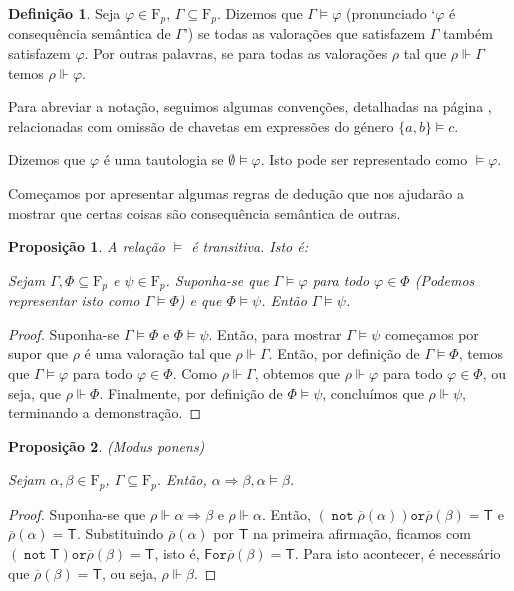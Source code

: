 \documentclass{report}
\newtheorem{prop}{Proposição}
\theoremstyle{definition}
\newtheorem{definicao}{Definição}
\theoremstyle{remark}
\newcommand{\F}{\mathrm{F}}
\newcommand{\lt}{\mathsf{T}}
\newcommand{\lf}{\mathsf{F}}
\DeclareMathOperator{\pnot}{\texttt{not}}
\newcommand{\por}{\mathbin{\texttt{or}}}
\newcommand{\imply}{\mathbin{\Rightarrow}}
\begin{document}
	\begin{definicao}\label{def:prop:consequenciasemantica}
	Seja $\varphi \in \F_p$, $\Gamma \subseteq \F_p$. Dizemos que $\Gamma \vDash \varphi$ (pronunciado `$\varphi$ é consequência semântica de $\Gamma$') se todas as valorações que satisfazem $\Gamma$ também satisfazem $\varphi$. Por outras palavras, se para todas as valorações $\rho$ tal que $\rho \Vdash \Gamma$ temos $\rho \Vdash \varphi$.
	
	Para abreviar a notação, seguimos algumas convenções, detalhadas na página \pageref{convencao:consequencia}, relacionadas com omissão de chavetas em expressões do género $\{a, b\} \vDash c$.
	
	Dizemos que $\varphi$ é uma tautologia se $\emptyset \vDash \varphi$. Isto pode ser representado como $\vDash \varphi$.
	\end{definicao}
	
	Começamos por apresentar algumas regras de dedução que nos ajudarão a mostrar que certas coisas são consequência semântica de outras.
	
	\begin{prop}
	A relação $\vDash$ é transitiva. Isto é:
	
	Sejam $\Gamma, \Phi \subseteq \F_p$ e $\psi \in \F_p$. Suponha-se que $\Gamma \vDash \varphi$ para todo $\varphi \in \Phi$ (Podemos representar isto como $\Gamma \vDash \Phi$) e que $\Phi \vDash \psi$. Então $\Gamma \vDash \psi$.
	\end{prop}
	
	\begin{proof} Suponha-se $\Gamma \vDash \Phi$ e $\Phi \vDash \psi$. Então, para mostrar $\Gamma \vDash \psi$ começamos por supor que $\rho$ é uma valoração tal que $\rho \Vdash \Gamma$. Então, por definição de $\Gamma \vDash \Phi$, temos que $\Gamma \vDash \varphi$ para todo $\varphi \in \Phi$. Como $\rho \Vdash \Gamma$, obtemos que $\rho \Vdash \varphi$ para todo $\varphi \in \Phi$, ou seja, que $\rho \Vdash \Phi$. Finalmente, por definição de $\Phi \vDash \psi$, concluímos que $\rho \Vdash \psi$, terminando a demonstração.
	\end{proof}
	
	\begin{prop}\label{prop:mp} (\textit{Modus ponens}) 
	
	Sejam $\alpha, \beta \in \F_p$, $\Gamma \subseteq \F_p$. Então, $\alpha \imply \beta, \alpha \vDash \beta$.
	\end{prop}
	
	\begin{proof}
	Suponha-se que $\rho \Vdash \alpha \imply \beta$ e $\rho \Vdash \alpha$. Então, $(\pnot\overline\rho(\alpha))\por\overline\rho(\beta) = \lt$ e $\overline\rho(\alpha) = \lt$. Substituindo $\overline\rho(\alpha)$ por $\lt$ na primeira afirmação, ficamos com $(\pnot\lt)\por\overline\rho(\beta) = \lt$, isto é, $\lf \por \overline\rho(\beta) = \lt$. Para isto acontecer, é necessário que $\overline\rho(\beta) = \lt$, ou seja, $\rho \Vdash \beta$.
	\end{proof}
	
\end{document}
